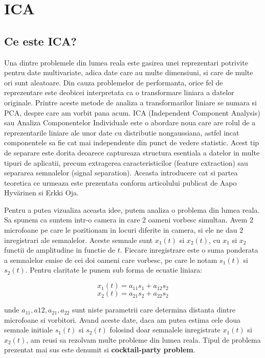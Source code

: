 \documentclass[12pt,oneside]{article}
\begin{document}
\newpage
\section{ICA}

\subsection{Ce este ICA? }
Una dintre problemele din lumea reala este gasirea unei reprezentari potrivite pentru date multivariate, adica date care au multe dimensiuni, si care de multe ori sunt aleatoare. Din cauza problemelor de performanta, orice fel de reprezentare este deobicei interpretata ca o transformare liniara a datelor originale. Printre aceste metode de analiza a transformarilor liniare se numara si PCA, despre care am vorbit pana acum. ICA (Independent Component Analysis) sau Analiza Componentelor Individuale este o abordare noua care are rolul de a reprezentarile liniare ale unor date cu distributie nongaussiana, astfel incat componentele sa fie cat mai independente din punct de vedere statistic. Acest tip de separare este dorita deoarece captureaza structura esentiala a datelor in multe tipuri de aplicatii, precum extragerea caracteristicilor (feature extraction) sau separarea semnalelor (signal separation). Aceasta introducere cat si partea teoretica ce urmeaza este prezentata conform articolului publicat de Aapo Hyvärinen si Erkki Oja.\cite{hyvarien}

Pentru a putea vizualiza aceasta idee, putem analiza o problema din lumea reala. Sa spunem ca suntem intr-o camera in care 2 oameni vorbesc simultan. Avem 2 microfoane pe care le pozitionam in locuri diferite in camera, si ele ne dau 2 inregistrari ale semnalelor. Aceste semnale sunt $x_1 (t)$ si $x_2 (t)$, cu $x_1$ si $x_2$ functii de amplitudine in functie de $t$. Fiecare inregistrare este o suma ponderata a semnalelor emise de cei doi oameni care vorbesc, pe care le notam $s_1(t)$ si $s_2(t)$. Pentru claritate le punem sub forma de ecuatie liniara:

\begin{equation}
	x_1(t)=a_{11} s_1 + a_{12} s_2
\end{equation}
\begin{equation}
	x_2(t)=a_{21} s_2 + a_{22} s_2
\end{equation}

unde $a_{11}, a{12}, a_{21}, a_{22}$ sunt niste parametrii care determina distanta dintre microfoane si vorbitori. Avand aceste date, daca am putea estima cele doua semnale initiale $s_1(t)$ si $s_2(t)$ folosind doar semnalele inregistrate $x_1(t)$ si $x_2(t)$, am reusi sa rezolvam multe probleme din lumea reala. Tipul de problema prezentat mai sus este denumit si \textbf{cocktail-party problem}.
\end{document}

